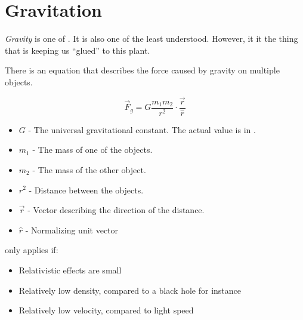 \section{Gravitation}\label{sec:Gravitation}
\begin{definition}[Gravity]\label{def:Gravity}
  \emph{Gravity} is one of .
  It is also one of the least understood.
  However, it it the thing that is keeping us ``glued'' to this plant.

  There is an equation that describes the force caused by gravity on multiple objects.

  \begin{equation}\label{eq:Gravitation}
    \vec{F}_{g} = G \frac{m_{1}m_{2}}{r^{2}} \cdot \frac{\vec{r}}{\hat{r}}
  \end{equation}
  \begin{itemize}[noitemsep, nolistsep]
    \item $G$ - The universal gravitational constant. The actual value is in .
    \item $m_{1}$ - The mass of one of the objects.
    \item $m_{2}$ - The mass of the other object.
    \item $r^{2}$ - Distance between the objects.
    \item $\vec{r}$ - Vector describing the direction of the distance.
    \item $\hat{r}$ - Normalizing unit vector
  \end{itemize}

  \begin{remark}
     only applies if:
    \begin{itemize}[noitemsep, nolistsep]
      \item Relativistic effects are small
      \item Relatively low density, compared to a black hole for instance
      \item Relatively low velocity, compared to light speed
    \end{itemize}
  \end{remark}
\end{definition}

